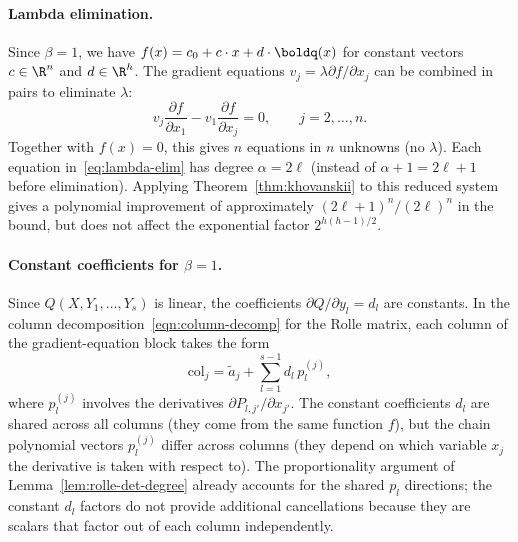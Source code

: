 \paragraph{Lambda elimination.}
Since $\beta = 1$, we have $f(x) = c_0 + c\cdot x + d \cdot \boldq(x)$ for constant vectors $c\in \R^n$ and $d\in \R^h$. The gradient equations $v_j = \lambda \partial f/\partial x_j$ can be combined in pairs to eliminate $\lambda$:
\begin{equation}\label{eq:lambda-elim}
  v_j \frac{\partial f}{\partial x_1} - v_1 \frac{\partial f}{\partial x_j} = 0, \qquad j = 2, \ldots, n.
\end{equation}
Together with $f(x) = 0$, this gives $n$ equations in $n$ unknowns (no $\lambda$). Each equation in~\eqref{eq:lambda-elim} has degree $\alpha = 2\ell$ (instead of $\alpha + 1 = 2\ell + 1$ before elimination). Applying Theorem~\ref{thm:khovanskii} to this reduced system gives a polynomial improvement of approximately $(2\ell + 1)^n / (2\ell)^n$ in the bound, but does not affect the exponential factor $2^{h(h-1)/2}$.

\paragraph{Constant coefficients for $\beta = 1$.}
Since $Q(X, Y_1, \ldots, Y_s)$ is linear, the coefficients $\partial Q/\partial y_l = d_l$ are constants. In the column decomposition~\eqref{eqn:column-decomp} for the Rolle matrix, each column of the gradient-equation block takes the form
\begin{equation*}
  \text{col}_j = \tilde{a}_j + \sum_{l=1}^{s-1} d_l\, p_l^{(j)},
\end{equation*}
where $p_l^{(j)}$ involves the derivatives $\partial P_{l,j'}/\partial x_{j'}$. The constant coefficients $d_l$ are shared across all columns (they come from the same function $f$), but the chain polynomial vectors $p_l^{(j)}$ differ across columns (they depend on which variable $x_j$ the derivative is taken with respect to). The proportionality argument of Lemma~\ref{lem:rolle-det-degree} already accounts for the shared $p_l$ directions; the constant $d_l$ factors do not provide additional cancellations because they are scalars that factor out of each column independently.


